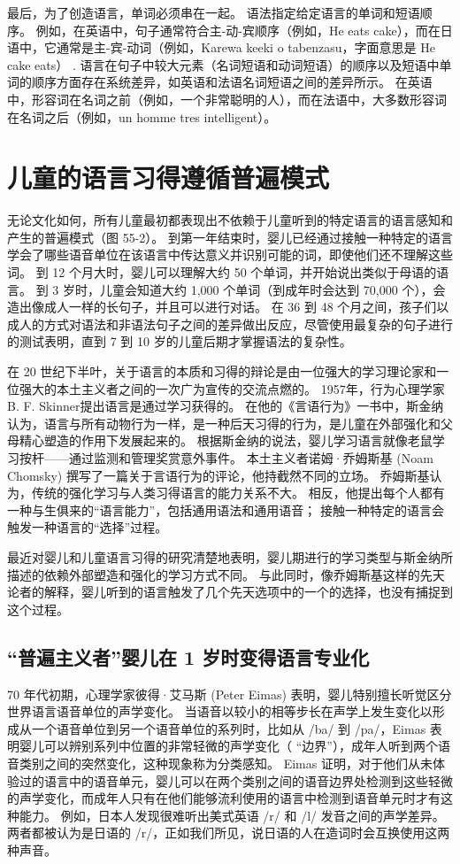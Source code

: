 最后，为了创造语言，单词必须串在一起。 语法指定给定语言的单词和短语顺序。 例如，在英语中，句子通常符合主-动-宾顺序（例如，He eats cake），而在日语中，它通常是主-宾-动词（例如，Karewa keeki o tabenzasu，字面意思是 He cake eats） . 语言在句子中较大元素（名词短语和动词短语）的顺序以及短语中单词的顺序方面存在系统差异，如英语和法语名词短语之间的差异所示。 在英语中，形容词在名词之前（例如，一个非常聪明的人），而在法语中，大多数形容词在名词之后（例如，un homme tres intelligent）。

\section{儿童的语言习得遵循普遍模式}
无论文化如何，所有儿童最初都表现出不依赖于儿童听到的特定语言的语言感知和产生的普遍模式（图 55-2）。 到第一年结束时，婴儿已经通过接触一种特定的语言学会了哪些语音单位在该语言中传达意义并识别可能的词，即使他们还不理解这些词。 到 12 个月大时，婴儿可以理解大约 50 个单词，并开始说出类似于母语的语言。 到 3 岁时，儿童会知道大约 1,000 个单词（到成年时会达到 70,000 个），会造出像成人一样的长句子，并且可以进行对话。 在 36 到 48 个月之间，孩子们以成人的方式对语法和非语法句子之间的差异做出反应，尽管使用最复杂的句子进行的测试表明，直到 7 到 10 岁的儿童后期才掌握语法的复杂性。

在 20 世纪下半叶，关于语言的本质和习得的辩论是由一位强大的学习理论家和一位强大的本土主义者之间的一次广为宣传的交流点燃的。 1957年，行为心理学家B. F. Skinner提出语言是通过学习获得的。 在他的《言语行为》一书中，斯金纳认为，语言与所有动物行为一样，是一种后天习得的行为，是儿童在外部强化和父母精心塑造的作用下发展起来的。 根据斯金纳的说法，婴儿学习语言就像老鼠学习按杆——通过监测和管理奖赏意外事件。 本土主义者诺姆·乔姆斯基 (Noam Chomsky) 撰写了一篇关于言语行为的评论，他持截然不同的立场。 乔姆斯基认为，传统的强化学习与人类习得语言的能力关系不大。 相反，他提出每个人都有一种与生俱来的“语言能力”，包括通用语法和通用语音； 接触一种特定的语言会触发一种语言的“选择”过程。

最近对婴儿和儿童语言习得的研究清楚地表明，婴儿期进行的学习类型与斯金纳所描述的依赖外部塑造和强化的学习方式不同。 与此同时，像乔姆斯基这样的先天论者的解释，婴儿听到的语言触发了几个先天选项中的一个的选择，也没有捕捉到这个过程。

\subsection{“普遍主义者”婴儿在 1 岁时变得语言专业化}
70 年代初期，心理学家彼得·艾马斯 (Peter Eimas) 表明，婴儿特别擅长听觉区分世界语言语音单位的声学变化。 当语音以较小的相等步长在声学上发生变化以形成从一个语音单位到另一个语音单位的系列时，比如从 /ba/ 到 /pa/，Eimas 表明婴儿可以辨别系列中位置的非常轻微的声学变化（ “边界”），成年人听到两个语音类别之间的突然变化，这种现象称为分类感知。 Eimas 证明，对于他们从未体验过的语言中的语音单元，婴儿可以在两个类别之间的语音边界处检测到这些轻微的声学变化，而成年人只有在他们能够流利使用的语言中检测到语音单元时才有这种能力。 例如，日本人发现很难听出美式英语 /r/ 和 /l/ 发音之间的声学差异。 两者都被认为是日语的 /r/，正如我们所见，说日语的人在造词时会互换使用这两种声音。


